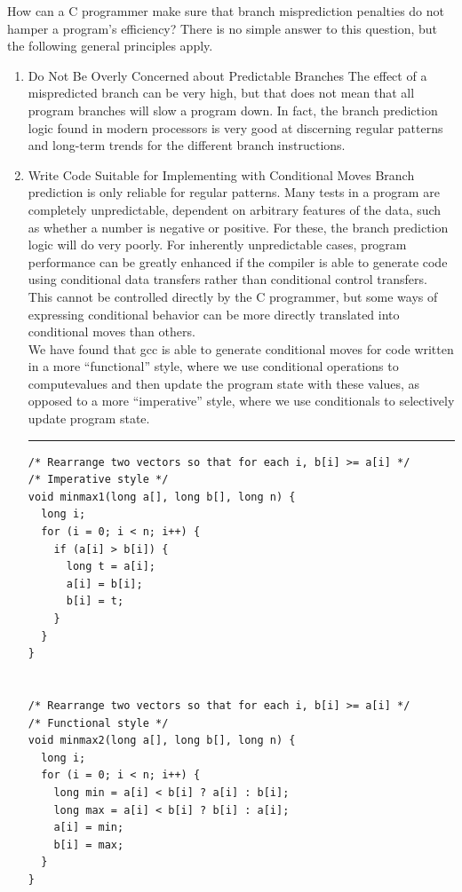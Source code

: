 \documentclass[11pt]{article}
\begin{document}
How can a C programmer make sure that branch misprediction penalties do not hamper a program’s efficiency? There is no simple answer to this question, but the following general principles apply.\\

\begin{enumerate}
\item Do Not Be Overly Concerned about Predictable Branches
\label{sec:org5d04c22}
The effect of a mispredicted branch can be very high, but that does not mean that all program branches will slow a program down. In fact, the branch prediction logic found in modern processors is very good at discerning regular patterns and long-term trends for the different branch instructions.\\

\item Write Code Suitable for Implementing with Conditional Moves
\label{sec:orga074d79}
Branch prediction is only reliable for regular patterns. Many tests in a program are completely unpredictable, dependent on arbitrary features of the data, such as whether a number is negative or positive. For these, the branch prediction logic will do very poorly. For inherently unpredictable cases, program performance can be greatly enhanced if the compiler is able to generate code using conditional data transfers rather than conditional control transfers. This cannot be controlled directly by the C programmer, but some ways of expressing conditional behavior can be more directly translated into conditional moves than others.\\

We have found that gcc is able to generate conditional moves for code written in a more “functional” style, where we use conditional operations to computevalues and then update the program state with these values, as opposed to a more “imperative” style, where we use conditionals to selectively update program state.\\

\noindent\rule{\textwidth}{0.5pt}
\begin{verbatim}
/* Rearrange two vectors so that for each i, b[i] >= a[i] */
/* Imperative style */
void minmax1(long a[], long b[], long n) {
  long i;
  for (i = 0; i < n; i++) {
    if (a[i] > b[i]) {
      long t = a[i];
      a[i] = b[i];
      b[i] = t;
    }
  }
}


/* Rearrange two vectors so that for each i, b[i] >= a[i] */
/* Functional style */
void minmax2(long a[], long b[], long n) {
  long i;
  for (i = 0; i < n; i++) {
    long min = a[i] < b[i] ? a[i] : b[i];
    long max = a[i] < b[i] ? b[i] : a[i];
    a[i] = min;
    b[i] = max;
  }
}


\end{verbatim}
\end{enumerate}
\end{document}
